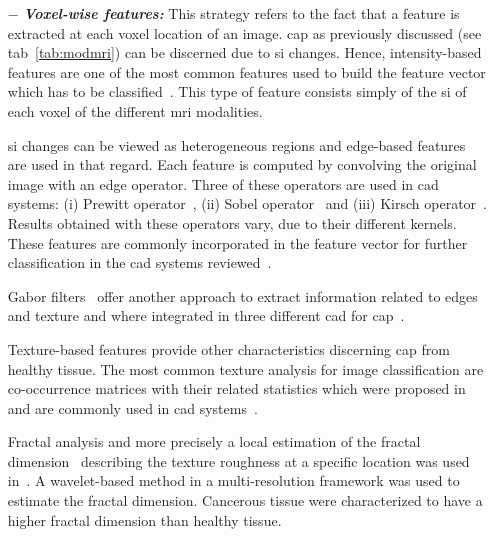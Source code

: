 \begin{enumerate}[leftmargin=*]

\item[$-$] \textbf{\textit{Voxel-wise features:}} This strategy refers to the fact that a feature is extracted at each voxel location of an image. \ac{cap} as previously discussed (see \ac{tab}~\ref{tab:modmri}) can be discerned due to \ac{si} changes. Hence, intensity-based features are one of the most common features used to build the feature vector which has to be classified~\cite{Ampeliotis2007,Ampeliotis2008,Artan2009,Artan2010,Chan2003,Langer2009,Litjens2011,Litjens2012,Litjens2014,Liu2009,Niaf2011,Niaf2012,Viswanath2008a,Viswanath2011}. This type of feature consists simply of the \ac{si} of each voxel of the different \ac{mri} modalities.

  \Ac{si} changes can be viewed as heterogeneous regions and edge-based features are used in that regard. Each feature is computed by convolving the original image with an edge operator. Three of these operators are used in \ac{cad} systems: (i) Prewitt operator~\cite{Prewitt1970}, (ii) Sobel operator~\cite{Sobel1970} and (iii) Kirsch operator~\cite{Kirsch1971}. Results obtained with these operators vary, due to their different kernels. These features are commonly incorporated in the feature vector for further classification in the \ac{cad} systems reviewed~\cite{Niaf2011,Niaf2012,Tiwari2009a,Tiwari2010,Tiwari2013,Viswanath2008,Viswanath2011}.

  Gabor filters~\cite{Gabor1946,Daugman1985} offer another approach to extract information related to edges and texture and where integrated in three different \ac{cad} for \ac{cap}~\cite{Viswanath2008a,Viswanath2012,Tiwari2012}.

  Texture-based features provide other characteristics discerning \ac{cap} from healthy tissue. The most common texture analysis for image classification are co-occurrence matrices with their related statistics which were proposed in~\cite{Haralick1973} and are commonly used in \ac{cad} systems~\cite{Antic2013,Niaf2011,Niaf2012,Tiwari2009a,Tiwari2010,Tiwari2013,Viswanath2008,Viswanath2008a,Viswanath2011,Viswanath2012}.

  Fractal analysis and more precisely a local estimation of the fractal dimension~\cite{Benassi1998} describing the texture roughness at a specific location was used in~\cite{Lopes2011}. A wavelet-based method in a multi-resolution framework was used to estimate the fractal dimension. Cancerous tissue were characterized to have a higher fractal dimension than healthy tissue.


\end{enumerate}
